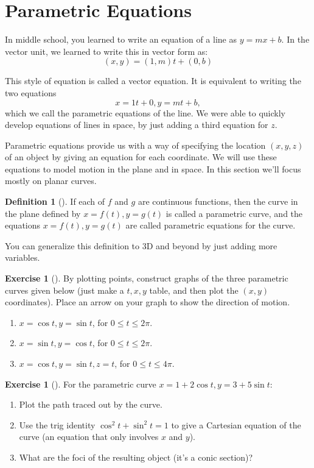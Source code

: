 \documentclass[10pt,]{book}
\theoremstyle{plain}
\theoremstyle{definition}
\newtheorem{definition}[theorem]{Definition}
\theoremstyle{definition}
\theoremstyle{definition}
\theoremstyle{definition}
\newtheorem{exploration}[project]{Exercise}
\theoremstyle{definition}
\numberwithin{equation}{section}
\begin{document}
\section[{Parametric Equations}]{Parametric Equations}\label{section-12}
In middle school, you learned to write an equation of a line as \(y=mx+b\). In the vector unit, we learned to write this in vector form as:%
\begin{equation*}
(x,y)=(1,m)t+(0,b)
\end{equation*}
%
\par
This style of equation is called a vector equation. It is equivalent to writing the two equations%
\begin{equation*}
x=1t+0,y=mt+b,
\end{equation*}
which we call the parametric equations of the line. We were able to quickly develop equations of lines in space, by just adding a third equation for \(z\).%
\par
Parametric equations provide us with a way of specifying the location \((x,y,z)\) of an object by giving an equation for each coordinate. We will use these equations to model motion in the plane and in space. In this section we'll focus mostly on planar curves.%
\begin{definition}[{}]\label{definition-18}
If each of \(f\) and \(g\) are continuous functions, then the curve in the plane defined by \(x=f(t),y=g(t)\) is called a parametric curve, and the equations \(x=f(t),y=g(t)\) are called parametric equations for the curve.%
\end{definition}
You can generalize this definition to 3D and beyond by just adding more variables.%
\begin{exploration}[]\label{exploration-72}
By plotting points, construct graphs of the three parametric curves given below (just make a \(t,x,y\) table, and then plot the \((x,y)\) coordinates). Place an arrow on your graph to show the direction of motion.%
\begin{enumerate}[font=\bfseries,label=(\alph*),ref=\alph*]
\item\label{task-116} \(x=\cos t, y=\sin t\), for \(0\leq t\leq 2\pi\).%
\item\label{task-117} \(x=\sin t, y=\cos t\), for \(0\leq t\leq 2\pi\).%
\item\label{task-118} \(x=\cos t, y=\sin t, z=t\), for \(0\leq t\leq 4\pi\).%
\end{enumerate}
\end{exploration}
\begin{exploration}[]\label{exploration-73}
For the parametric curve \(x=1+2\cos t, y=3+5\sin t\):%
\begin{enumerate}[font=\bfseries,label=(\alph*),ref=\alph*]
\item\label{task-119} Plot the path traced out by the curve.%
\item\label{task-120} Use the trig identity \(\cos^2t+\sin^2t=1\) to give a Cartesian equation of the curve (an equation that only involves \(x\) and \(y\)).%
\item\label{task-121} What are the foci of the resulting object (it's a conic section)?%
\end{enumerate}
\end{exploration}
\end{document}
